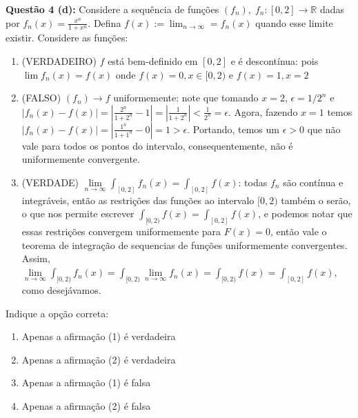 \documentclass{article}
\begin{document}
\textbf{Questão 4 (d):} Considere a sequência de funções $(f_n), \; f_n: [0,2]
\to \mathbb R$ dadas por $f_n(x) = \frac{x^n}{1+x^n}$. Defina $f(x) := \lim_{n
\to \infty} = f_n(x)$ quando esse limite existir. Considere as funções:

\begin{enumerate}
  	\item (VERDADEIRO) $f$ está bem-definido em $[0,2]$ e é descontínua: pois
  $\lim f_n(x) = f(x)$ onde $f(x) = 0, x \in [0,2)$ e $f(x) = 1, x = 2$
  
	\item (FALSO) $(f_n) \to f$ uniformemente: note que tomando $x=2$, $\epsilon =
  1/2^n$ e $|f_n(x) - f(x)| = |\frac{2^n}{1+2^n} - 1| = |\frac{1}{1+2^n} | < \frac{1}{2^n} = \epsilon$. Agora,
fazendo $x=1$ temos $|f_n(x) - f(x)| = |\frac{1^n}{1+1^n} - 0| = 1 > \epsilon$.
Portando, temos um $\epsilon> 0$ que não vale para todos os pontos do intervalo,
consequentemente, não é uniformemente convergente.

	\item (VERDADE) $\lim \limits_{n \to \infty} \int_{[0,2]} f_n(x) = \int_{[0,2]}
	f(x)$: todas $f_n$ são contínua e integráveis, então as restrições das funções
	ao intervalo $[0,2)$ também o serão, o que nos permite escrever $\int_{[0,2)}
	f(x) = \int_{[0,2]}f(x) $, e podemos notar que essas restrições convergem
	uniformemente para $F(x) = 0$, então vale o teorema de integração de sequencias
	de funções uniformemente convergentes. Assim, $\lim \limits_{n \to \infty}
\int_{[0,2)} f_n(x) = \int_{[0,2)} \lim \limits_{n \to \infty} f_n(x) =
\int_{[0,2)} f(x) = \int_{[0,2]} f(x)$, como desejávamos.

\end{enumerate}

Indique a opção correta:

\begin{enumerate}[label=(\alph*)]
  \item Apenas a afirmação (1) é verdadeira
  \item Apenas a afirmação (2) é verdadeira
  \item Apenas a afirmação (1) é falsa
  \item Apenas a afirmação (2) é falsa
\end{enumerate}
\end{document}
